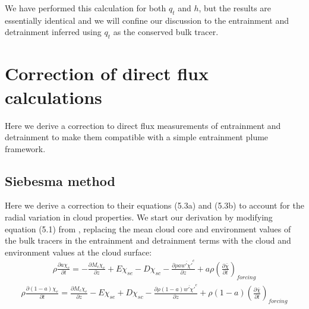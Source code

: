 \documentclass[draft,grl]{AGUTeX}
\begin{document}
\begin{article}
  We have performed this calculation for both $q_t$ and $h$, but the 
results are essentially identical and we will confine our discussion to the 
entrainment and detrainment inferred using $q_t$ as the conserved bulk tracer.  



\section{Correction of direct flux calculations}

Here we derive a correction to direct flux measurements of entrainment and 
detrainment to make them compatible with a simple entrainment plume framework.



\subsection{Siebesma method}

Here we derive a correction to their equations (5.3a) and (5.3b) to account 
for the radial variation in cloud properties.  We start our derivation by 
modifying equation (5.1) from \cite{Siebesma1995}, replacing the mean cloud 
core and environment values of the bulk tracers in the entrainment and 
detrainment terms with the cloud and environment values at the cloud surface:
\begin{eqnarray}
  \label{eq:entrainment_derivation_1}
    \rho \frac{\partial a \chi_c}{\partial t} 
    = - \frac{\partial M_c \chi_c}{\partial z} 
    + E \chi_{se} - D \chi_{sc} 
    - \frac{\partial \rho a \overline{w' \chi'}^c}{\partial z} 
    + a \rho \left(\frac{\partial \bar{\chi}}{\partial t}\right)_{forcing}
\end{eqnarray}
\begin{eqnarray}
  \label{eq:detrainment_derivation_1}
    \rho \frac{\partial (1 - a) \chi_e}{\partial t}
    = \frac{\partial M_c \chi_e}{\partial z} 
    - E \chi_{se} + D \chi_{sc} 
    - \frac{\partial \rho (1 - a) \overline{w' \chi'}^e}{\partial z} 
    + \rho (1 - a) \left(\frac{\partial \bar{\chi}}{\partial t}\right)_{forcing}
\end{eqnarray}


\end{article}
\end{document}

